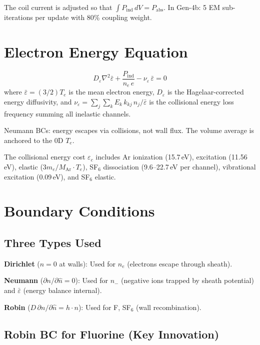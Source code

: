 \documentclass[11pt,a4paper]{article}
\renewcommand{\ne}{n_e}
\newcommand{\Te}{T_e}
\newcommand{\Ar}{\mathrm{Ar}}
\begin{document}
The coil current is adjusted so that $\int P_{\mathrm{ind}}\,dV = P_{\mathrm{abs}}$.  In Gen-4b: 5 EM sub-iterations per update with 80\% coupling weight.

\section{Electron Energy Equation}
\label{sec:energy}

\begin{equation}
\boxed{D_\varepsilon\nabla^2\bar{\varepsilon} + \frac{P_{\mathrm{ind}}}{\ne\,e} - \nu_\varepsilon\,\bar{\varepsilon} = 0}
\end{equation}
where $\bar{\varepsilon} = (3/2)\Te$ is the mean electron energy, $D_\varepsilon$ is the Hagelaar-corrected energy diffusivity, and $\nu_\varepsilon = \sum_j\sum_k E_k\,k_{kj}\,n_j / \bar{\varepsilon}$ is the collisional energy loss frequency summing all inelastic channels.

Neumann BCs: energy escapes via collisions, not wall flux.  The volume average is anchored to the 0D $\Te$.

The collisional energy cost $\varepsilon_c$ includes Ar ionization (15.7\,eV), excitation (11.56\,eV), elastic ($3m_e/M_{\Ar}\cdot\Te$), SF$_6$ dissociation (9.6--22.7\,eV per channel), vibrational excitation (0.09\,eV), and SF$_6$ elastic.

\section{Boundary Conditions}
\label{sec:bcs}

\subsection{Three Types Used}

\textbf{Dirichlet} ($n = 0$ at walls): Used for $\ne$ (electrons escape through sheath).

\textbf{Neumann} ($\partial n/\partial\hat{n} = 0$): Used for $n_-$ (negative ions trapped by sheath potential) and $\bar{\varepsilon}$ (energy balance internal).

\textbf{Robin} ($D\,\partial n/\partial\hat{n} = h\cdot n$): Used for F, SF$_6$ (wall recombination).

\subsection{Robin BC for Fluorine (Key Innovation)}
\end{document}
